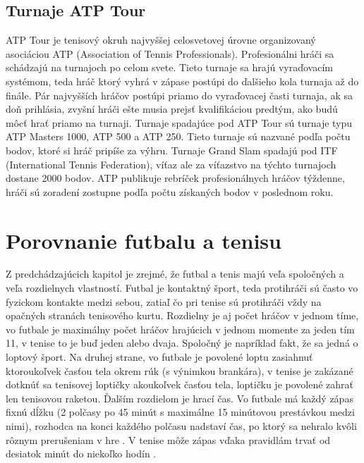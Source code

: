 \subsection{Turnaje ATP Tour}
ATP Tour je tenisový okruh najvyššej celosvetovej úrovne organizovaný asociáciou ATP (Association of Tennis Professionals).
Profesionálni hráči sa schádzajú na turnajoch po celom svete.
Tieto turnaje sa hrajú vyraďovacím systémom, teda hráč ktorý vyhrá v zápase postúpi do ďalšieho kola turnaja až do finále.
Pár najvyšších hráčov postúpi priamo do vyraďovacej časti turnaja, ak sa doň prihlásia, zvyšní hráči ešte musia prejsť kvalifikáciou predtým, ako budú môcť hrať priamo na turnaji.
Turnaje spadajúce pod ATP Tour sú turnaje typu ATP Masters 1000, ATP 500 a ATP 250. Tieto turnaje sú nazvané podľa počtu bodov, ktoré si hráč pripíše za výhru.
Turnaje Grand Slam spadajú pod ITF (International Tennis Federation), víťaz ale za víťazstvo na týchto turnajoch dostane 2000 bodov.
ATP publikuje rebríček profesionálnych hráčov týždenne, hráči sú zoradení zostupne podľa počtu získaných bodov v poslednom roku.


\section{Porovnanie futbalu a tenisu}
Z predchádzajúcich kapitol je zrejmé, že futbal a tenis majú veľa spoločných a veľa rozdielnych vlastností. 
Futbal je kontaktný šport, teda protihráči sú často vo fyzickom kontakte medzi sebou, zatiaľ čo pri tenise sú protihráči vždy na opačných stranách tenisového kurtu. 
Rozdielny je aj počet hráčov v jednom tíme, vo futbale je maximálny počet hráčov hrajúcich v jednom momente za jeden tím 11, v tenise to je buď jeden alebo dvaja.
Spoločný je napríklad fakt, že sa jedná o loptový šport. 
Na druhej strane, vo futbale je povolené loptu zasiahnuť ktoroukoľvek časťou tela okrem rúk (s výnimkou brankára), v tenise je zakázané dotknúť sa tenisovej loptičky akoukoľvek časťou tela, loptičku je povolené zahrať len tenisovou raketou.
Ďalším rozdielom je hrací čas. Vo futbale má každý zápas fixnú dĺžku (2 polčasy po 45 minút s maximálne 15 minútovou prestávkou medzi nimi), rozhodca na konci každého polčasu nadstaví čas, po ktorý sa nehralo kvôli rôznym prerušeniam v hre 
\citep{hry1}.
V tenise môže zápas vďaka pravidlám trvať od desiatok minút do niekoľko hodín \citep{tenis:kor}.


